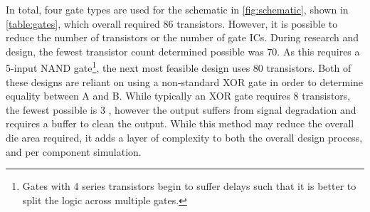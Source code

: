 In total, four gate types are used for the schematic in \cref{fig:schematic}, shown in \cref{table:gates},
which overall required 86 transistors. However, it 
is possible to reduce the number of transistors or the number of gate ICs.
During research and design, the fewest transistor count determined possible
was 70. As this requires a 5-input NAND gate\footnote{
    Gates with 4 series transistors begin to suffer delays such that it is better to split the logic across multiple gates.
}, the next most feasible design uses 80 transistors. Both of these designs are reliant on using a non-standard XOR gate
in order to determine equality between A and B. While typically an XOR gate requires 8 transistors,
the fewest possible is 3 \cite{chandra2015}, however the output suffers from signal degradation and requires a
buffer to clean the output. While this method may reduce the overall die area required,
it adds a layer of complexity to both the overall design process, and per component simulation.

